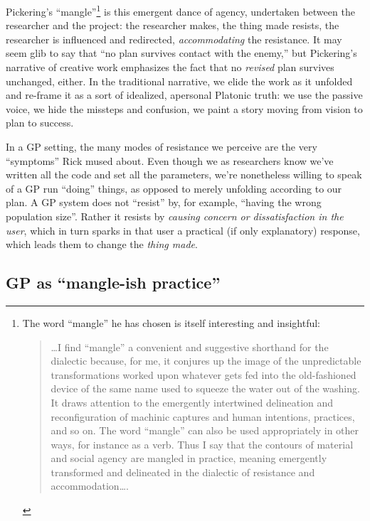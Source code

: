 Pickering's ``mangle''\footnote{The word ``mangle'' he has chosen is itself interesting and insightful:

\begin{quote}
\ldots{}I find ``mangle'' a convenient and suggestive shorthand for the dialectic because, for me, it conjures up the image of the unpredictable transformations worked upon whatever gets fed into the old-fashioned device of the same name used to squeeze the water out of the washing. It draws attention to the emergently intertwined delineation and reconfiguration of machinic captures and human intentions, practices, and so on. The word ``mangle'' can also be used appropriately in other ways, for instance as a verb. Thus I say that the contours of material and social agency are mangled in practice, meaning emergently transformed and delineated in the dialectic of resistance and accommodation\ldots{}.
\end{quote}} is this emergent dance of agency, undertaken between the researcher and the project: the researcher makes, the thing made resists, the researcher is influenced and redirected, \emph{accommodating} the resistance. It may seem glib to say that ``no plan survives contact with the enemy,'' but Pickering's narrative of creative work emphasizes the fact that no \emph{revised} plan survives unchanged, either. In the traditional narrative, we elide the work as it unfolded and re-frame it as a sort of idealized, apersonal Platonic truth: we use the passive voice, we hide the missteps and confusion, we paint a story moving from vision to plan to success.

In a GP setting, the many modes of resistance we perceive are the very ``symptoms'' Rick mused about. Even though we as researchers know we've written all the code and set all the parameters, we're nonetheless willing to speak of a GP run ``doing'' things, as opposed to merely unfolding according to our plan. A GP system does not ``resist'' by, for example, ``having the wrong population size''. Rather it resists by \emph{causing concern or dissatisfaction in the user}, which in turn sparks in that user a practical (if only explanatory) response, which leads them to change the \emph{thing made}.

\subsection{GP as ``mangle-ish practice''}\hypertarget{gp-as-mangle-ish-practice}{}\label{gp-as-mangle-ish-practice}

